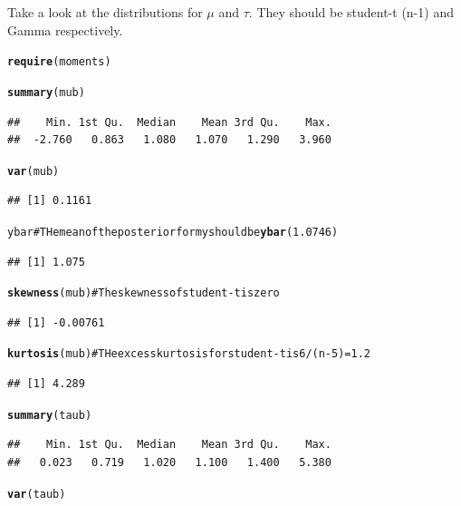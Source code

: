 \documentclass[12pt, a4paper, oneside]{article}\usepackage{graphicx, color}
\makeatletter
\newcommand{\hlfunctioncall}[1]{\textcolor[rgb]{0.501960784313725,0,0.329411764705882}{\textbf{#1}}}%
\newcommand{\hlcomment}[1]{\textcolor[rgb]{0.180392156862745,0.6,0.341176470588235}{#1}}%
\newenvironment{kframe}{%
 \def\at@end@of@kframe{}%
 \ifinner\ifhmode%
  \def\at@end@of@kframe{\end{minipage}}%
  \begin{minipage}{\columnwidth}%
 \fi\fi%
 \def\FrameCommand##1{\hskip\@totalleftmargin \hskip-\fboxsep
 \colorbox{shadecolor}{##1}\hskip-\fboxsep
     \hskip-\linewidth \hskip-\@totalleftmargin \hskip\columnwidth}%
 \MakeFramed {\advance\hsize-\width
   \@totalleftmargin\z@ \linewidth\hsize
   \@setminipage}}%
 {\par\unskip\endMakeFramed%
 \at@end@of@kframe}
\newenvironment{knitrout}{}{} %
\makeatother
\begin{document}
Take a look at the distributions for $\mu$ and $\tau$. They should be student-t (n-1) and Gamma respectively. 
\begin{knitrout}
\color{fgcolor}\begin{kframe}
\begin{alltt}
\hlfunctioncall{require}(moments)
\end{alltt}


{\ttfamily\noindent\itshape\color{messagecolor}{\#\# Loading required package: moments}}\begin{alltt}
\hlfunctioncall{summary}(mub)
\end{alltt}
\begin{verbatim}
##    Min. 1st Qu.  Median    Mean 3rd Qu.    Max. 
##  -2.760   0.863   1.080   1.070   1.290   3.960
\end{verbatim}
\begin{alltt}
\hlfunctioncall{var}(mub)
\end{alltt}
\begin{verbatim}
## [1] 0.1161
\end{verbatim}
\begin{alltt}
ybar  \hlcomment{# THe mean of the posterior for my should be \hlfunctioncall{ybar} (1.0746)}
\end{alltt}
\begin{verbatim}
## [1] 1.075
\end{verbatim}
\begin{alltt}
\hlfunctioncall{skewness}(mub)  \hlcomment{# The skewness of student-t is zero}
\end{alltt}
\begin{verbatim}
## [1] -0.00761
\end{verbatim}
\begin{alltt}
\hlfunctioncall{kurtosis}(mub)  \hlcomment{# THe excess kurtosis for student-t is 6/(n-5) = 1.2}
\end{alltt}
\begin{verbatim}
## [1] 4.289
\end{verbatim}
\begin{alltt}
\hlfunctioncall{summary}(taub)
\end{alltt}
\begin{verbatim}
##    Min. 1st Qu.  Median    Mean 3rd Qu.    Max. 
##   0.023   0.719   1.020   1.100   1.400   5.380
\end{verbatim}
\begin{alltt}
\hlfunctioncall{var}(taub)
\end{alltt}

\end{kframe}
\end{knitrout}
\end{document}

